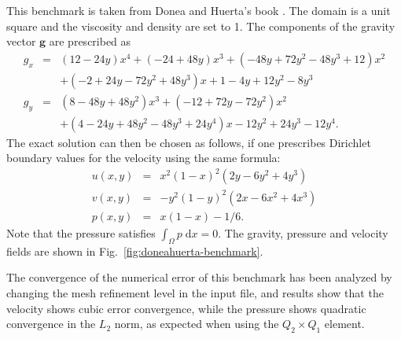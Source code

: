 \documentclass{article}
\begin{document}
This benchmark is taken from Donea and Huerta's book \cite{DH03book}.
The domain is a unit square and the viscosity and density are set to 1. 
The components of the gravity vector $\mathbf g$ are prescribed as 
\begin{eqnarray}
g_x &=& (12 - 24y) x^4 + (-24 + 48y) x^3 + (-48y + 72y^2 - 48 y^3 + 12) x^2 \nonumber\\
    && + (-2 + 24y -72y^2+48y^3)x + 1-4y + 12y^2-8y^3 \nonumber\\ 
g_y &=& (8 - 48y + 48 y^2) x^3 + (-12 + 72y - 72y^2) x^2  \nonumber\\
    && + (4 - 24y + 48y^2 - 48y^3 + 24y^4) x - 12y^2 + 24y^3 - 12y^4. 
\end{eqnarray}
The exact solution can then be chosen as follows, if one prescribes Dirichlet boundary 
values for the velocity using the same formula:
\begin{eqnarray}
u(x,y) &=& x^2(1- x)^2 (2y - 6y^2 + 4y^3)  \nonumber\\
v(x,y) &=& -y^2 (1 - y)^2 (2x - 6x^2 + 4x^3) \nonumber\\
p(x,y) &=& x(1 -x) -1/6. 
\end{eqnarray}
Note that the pressure satisfies $\int_{\Omega} p \; \text{d}x = 0$.
The gravity, pressure and velocity fields are shown in Fig.~\ref{fig:doneahuerta-benchmark}.

The convergence of the numerical error of this benchmark has been analyzed by
changing the mesh refinement level in the input file, and
results show that the velocity shows cubic error
convergence, while the pressure shows quadratic convergence in the 
$L_2$ norm, as expected when using the $Q_2\times Q_1$ element.
\end{document}
